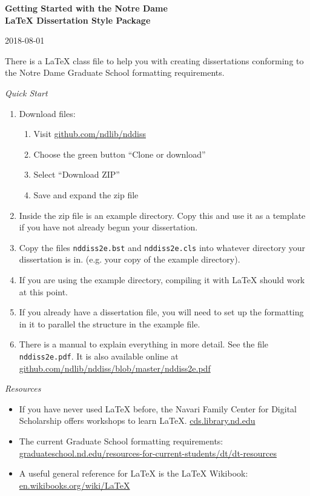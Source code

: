 \documentclass[10pt]{article}
\begin{document}
\begin{center}
    \textbf{Getting Started with the Notre Dame\\ LaTeX Dissertation Style Package}
\end{center}

\begin{flushright}
    2018-08-01
\end{flushright}

There is a LaTeX class file to help you with creating dissertations
conforming to the Notre Dame Graduate School formatting requirements.

\begin{center}\textit{Quick Start}\end{center}

\begin{enumerate}
    \item Download files: \begin{enumerate}
            \item Visit \url{github.com/ndlib/nddiss}
            \item Choose the green button ``Clone or download''
            \item Select ``Download ZIP''
            \item Save and expand the zip file
        \end{enumerate}
    \item Inside the zip file is an example directory. Copy this and use it as a template if you have not already begun your dissertation.
    \item Copy the files \texttt{nddiss2e.bst} and \texttt{nddiss2e.cls} into whatever directory your dissertation is in. (e.g. your copy of the example directory).
    \item If you are using the example directory, compiling it with LaTeX should work at this point.
    \item If you already have a dissertation file, you will need to set up the formatting in it to parallel the structure in the example file.
    \item There is a manual to explain everything in more detail. See the file \texttt{nddiss2e.pdf}. It is also available online at 
\url{github.com/ndlib/nddiss/blob/master/nddiss2e.pdf}
\end{enumerate}


\begin{center}\textit{Resources}\end{center}
\begin{itemize}
    \item If you have never used LaTeX before, the Navari Family Center for Digital Scholarship offers workshops to learn LaTeX.
        \url{cds.library.nd.edu}
    \item The current Graduate School formatting requirements:
        \url{graduateschool.nd.edu/resources-for-current-students/dt/dt-resources}
    \item A useful general reference for LaTeX is the LaTeX Wikibook:
        \url{en.wikibooks.org/wiki/LaTeX}
\end{itemize}
\end{document}
